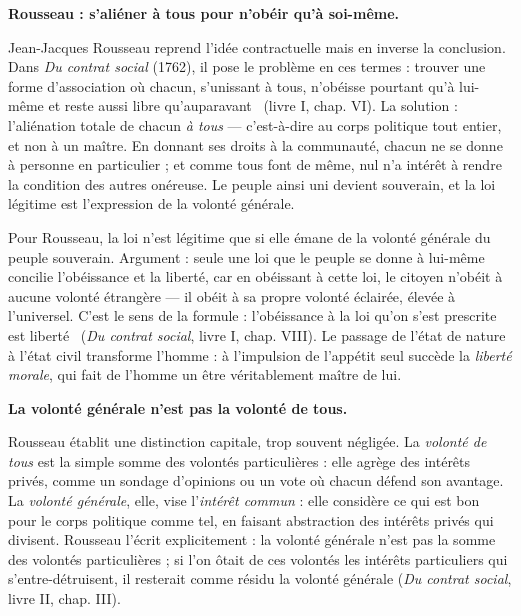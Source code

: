 \documentclass[11pt]{article}
\newcommand{\cle}[1]{{\popxbold\color{popdark}#1}}
\begin{document}
\textbf{Rousseau : s'aliéner à tous pour n'obéir qu'à soi-même.}\par

Jean-Jacques Rousseau reprend l'idée contractuelle mais en inverse la conclusion. Dans \emph{Du contrat social} (1762), il pose le problème en ces termes : trouver une forme d'association où chacun, \guillemotleft s'unissant à tous, n'obéisse pourtant qu'à lui-même et reste aussi libre qu'auparavant \guillemotright\ (livre I, chap. VI). La solution : l'aliénation totale de chacun \emph{à tous} — c'est-à-dire au corps politique tout entier, et non à un maître. En donnant ses droits à la communauté, chacun ne se donne à personne en particulier ; et comme tous font de même, nul n'a intérêt à rendre la condition des autres onéreuse. Le peuple ainsi uni devient souverain, et la loi légitime est l'expression de la \cle{volonté générale}.

\begin{propriete}
Pour Rousseau, la loi n'est légitime que si elle émane de la volonté générale du peuple souverain. Argument : seule une loi que le peuple se donne à lui-même concilie l'obéissance et la liberté, car en obéissant à cette loi, le citoyen n'obéit à aucune volonté étrangère — il obéit à sa propre volonté éclairée, élevée à l'universel. C'est le sens de la formule : \guillemotleft l'obéissance à la loi qu'on s'est prescrite est liberté \guillemotright\ (\emph{Du contrat social}, livre I, chap. VIII). Le passage de l'état de nature à l'état civil transforme l'homme : à l'impulsion de l'appétit seul succède la \emph{liberté morale}, qui fait de l'homme un être véritablement maître de lui.
\end{propriete}

\textbf{La volonté générale n'est pas la volonté de tous.}\par

Rousseau établit une distinction capitale, trop souvent négligée. La \emph{volonté de tous} est la simple somme des volontés particulières : elle agrège des intérêts privés, comme un sondage d'opinions ou un vote où chacun défend son avantage. La \emph{volonté générale}, elle, vise l'\emph{intérêt commun} : elle considère ce qui est bon pour le corps politique comme tel, en faisant abstraction des intérêts privés qui divisent. Rousseau l'écrit explicitement : la volonté générale n'est pas la somme des volontés particulières ; si l'on ôtait de ces volontés les intérêts particuliers qui s'entre-détruisent, il resterait comme résidu la volonté générale (\emph{Du contrat social}, livre II, chap. III).
\end{document}
